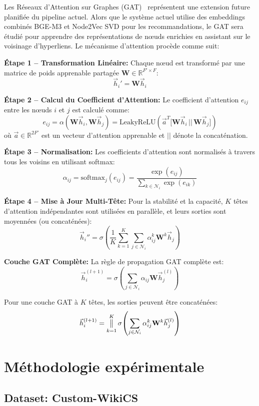 Les Réseaux d'Attention sur Graphes (GAT)~\cite{velickovic2018graph} représentent une extension future planifiée du pipeline actuel. Alors que le système actuel utilise des embeddings combinés BGE-M3 et Node2Vec SVD pour les recommandations, le GAT sera étudié pour apprendre des représentations de nœuds enrichies en assistant sur le voisinage d'hyperliens. Le mécanisme d'attention procède comme suit:

\textbf{Étape 1 -- Transformation Linéaire:} Chaque nœud est transformé par une matrice de poids apprenable partagée $\mathbf{W} \in \mathbb{R}^{F' \times F}$:
\[
\vec{h}_i' = \mathbf{W} \vec{h}_i
\]

\textbf{Étape 2 -- Calcul du Coefficient d'Attention:} Le coefficient d'attention $e_{ij}$ entre les nœuds $i$ et $j$ est calculé comme:
\[
e_{ij} = \alpha(\mathbf{W}\vec{h}_i, \mathbf{W}\vec{h}_j) = \text{LeakyReLU}\!\left(\vec{a}^T \bigl[\mathbf{W}\vec{h}_i \, || \, \mathbf{W}\vec{h}_j \bigr]\right)
\]
où $\vec{a} \in \mathbb{R}^{2F'}$ est un vecteur d'attention apprenable et $||$ dénote la concaténation.

\textbf{Étape 3 -- Normalisation:} Les coefficients d'attention sont normalisés à travers tous les voisins en utilisant softmax:
\[
\alpha_{ij} = \text{softmax}_j(e_{ij}) = \frac{\exp(e_{ij})}{\sum_{k \in \mathcal{N}_i} \exp(e_{ik})}
\]

\textbf{Étape 4 -- Mise à Jour Multi-Tête:} Pour la stabilité et la capacité, $K$ têtes d'attention indépendantes sont utilisées en parallèle, et leurs sorties sont moyennées (ou concaténées):
\[
\vec{h}_i'' = \sigma\!\left(\frac{1}{K} \sum_{k=1}^K \sum_{j \in \mathcal{N}_i} \alpha_{ij}^k \mathbf{W}^k \vec{h}_j \right)
\]

\textbf{Couche GAT Complète:} La règle de propagation GAT complète est:
\[
\vec{h}_i^{(l+1)} = \sigma\!\left(\sum_{j \in \mathcal{N}_i} \alpha_{ij} \mathbf{W} \vec{h}_j^{(l)}\right)
\]

Pour une couche GAT à $K$ têtes, les sorties peuvent être concaténées:
\[
\vec{h}_i^{(l+1)} = \bigparallel_{k=1}^K \sigma\!\left(\sum_{j \in \mathcal{N}_i} \alpha_{ij}^k \mathbf{W}^k \vec{h}_j^{(l)}\right)
\]


\section{Méthodologie expérimentale}

\subsection{Dataset: Custom-WikiCS}

